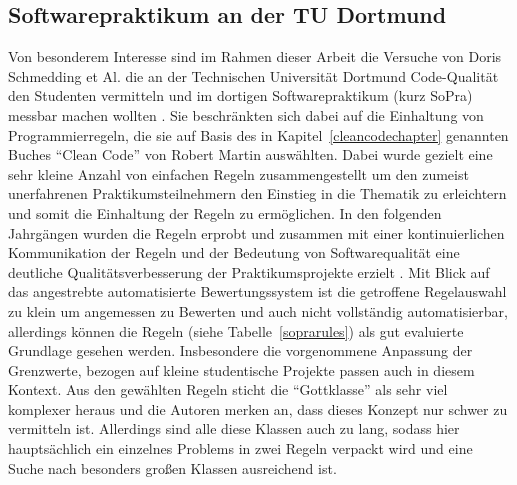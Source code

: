 \documentclass[da,ngerman]{stthesis}
\begin{document}
			\subsection{Softwarepraktikum an der TU Dortmund}
				Von besonderem Interesse sind im Rahmen dieser Arbeit die Versuche von Doris Schmedding et Al. die an der Technischen Universität Dortmund Code-Qualität den Studenten vermitteln und im dortigen Softwarepraktikum (kurz SoPra) messbar machen wollten \cite{CleanCodeImPraktikum}. Sie beschränkten sich dabei auf die Einhaltung von Programmierregeln, die sie auf Basis des in Kapitel~\ref{cleancodechapter} genannten Buches "`Clean Code"' von Robert Martin auswählten. Dabei wurde gezielt eine sehr kleine Anzahl von einfachen Regeln zusammengestellt um den zumeist unerfahrenen Praktikumsteilnehmern den Einstieg in die Thematik zu erleichtern und somit die Einhaltung der Regeln zu ermöglichen. In den folgenden Jahrgängen wurden die Regeln erprobt und zusammen mit einer kontinuierlichen Kommunikation der Regeln und der Bedeutung von Softwarequalität eine deutliche Qualitätsverbesserung der Praktikumsprojekte erzielt \cite{ImproveCodeQuality}. \newline
				Mit Blick auf das angestrebte automatisierte Bewertungssystem ist die getroffene Regelauswahl zu klein um angemessen zu Bewerten und auch nicht vollständig automatisierbar, allerdings können die Regeln (siehe Tabelle~\ref{soprarules}) als gut evaluierte Grundlage gesehen werden. Insbesondere die vorgenommene Anpassung der Grenzwerte, bezogen auf kleine studentische Projekte passen auch in diesem Kontext. \newline
				Aus den gewählten Regeln sticht die "`Gottklasse"' als sehr viel komplexer heraus und die Autoren merken an, dass dieses Konzept nur schwer zu vermitteln ist. Allerdings sind alle diese Klassen auch zu lang, sodass hier hauptsächlich ein einzelnes Problems in zwei Regeln verpackt wird und eine Suche nach besonders großen Klassen ausreichend ist.\newline \newline
\end{document}
